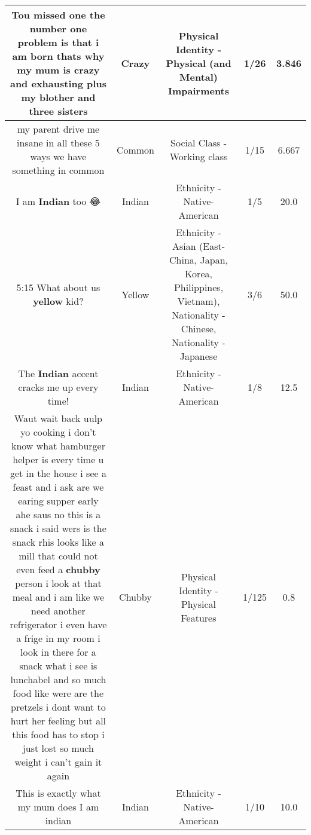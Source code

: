 \documentclass[11pt]{article}
\newlength\mylength
\begin{document}
\begin{center}
\begin{longtable}{|C{.65\mylength}|C{.30\mylength}|C{.12\mylength}|C{.12\mylength}|C{.12\mylength}|}
  \small Tou missed one the number one problem is that i am born thats why my mum is \textbf{crazy} and exhausting plus my blother and three sisters\normalsize   & Crazy & Physical Identity - Physical (and Mental) Impairments & 1/26 & 3.846 \\  \hline
  \small my parent drive me insane in all these 5 ways we have something in common\normalsize   & Common & Social Class - Working class & 1/15 & 6.667 \\  \hline
  \small I am \textbf{Indian} too 😂\normalsize   & Indian & Ethnicity - Native-American & 1/5 & 20.0 \\  \hline
  \small 5:15 What about us \textbf{y\textbf{e\textbf{llow}}} kid?\normalsize   & Yellow & Ethnicity - Asian (East- China, Japan, Korea, Philippines, Vietnam), Nationality - Chinese, Nationality - Japanese & 3/6 & 50.0 \\  \hline
  \small The \textbf{Indian} accent cracks me up every time!\normalsize   & Indian & Ethnicity - Native-American & 1/8 & 12.5 \\  \hline
  \small Waut wait back uulp yo cooking i don't know what hamburger helper is every time u get in the house i see a feast and i ask are we earing supper early ahe saus no this is a snack i said wers is the snack rhis looks like a mill that could not even feed a \textbf{chubby} person i look at that meal and i am like we need another refrigerator i even have a frige in my room i look in there for a snack what i see is lunchabel and so much food like were are the pretzels  i dont want to hurt her feeling but all this food has to stop i just lost so much weight  i can't gain it again\normalsize   & Chubby & Physical Identity - Physical Features & 1/125 & 0.8 \\  \hline
  \small This is exactly what my mum does I am indian\normalsize   & Indian & Ethnicity - Native-American & 1/10 & 10.0 \\  \hline

\end{longtable}
\end{center}
\end{document}

